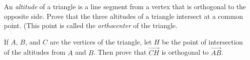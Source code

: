
\begin{Exercise}[
name={},
title={}, 
difficulty=0,
origin={\cite{SM}}]
An \emph{altitude} of a triangle is a line segment from a vertex that is orthogonal to the opposite side. Prove that the three altitudes of a triangle intersect at a common point. (This point is called the \emph{orthocenter} of the triangle.
\end{Exercise}

\begin{Answer}
If $A$, $B$, and $C$ are the vertices of the triangle, let $H$ be the point of intersection of the altitudes from $A$ and $B$. Then prove that $\overrightarrow{CH}$ is orthogonal to $\overrightarrow{AB}$.
\end{Answer}
